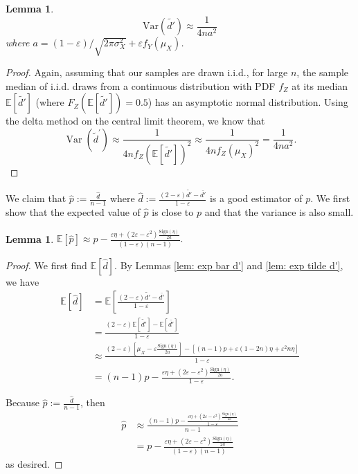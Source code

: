 \documentclass[10pt,onecolumn,letterpaper]{article}
\newtheorem{lem}[thm]{Lemma}
\newcommand{\ee}{\mathbb{E}}
\newcommand{\Var}{\mathrm{Var}}
\newcommand{\eps}{\varepsilon}
\begin{document}
\begin{lem} \label{lem: var tilde d'}
$$\Var(\tilde{d'}) \approx \frac{1}{4na^2}$$ where $a = (1-\eps)/\sqrt{2\pi\sigma_X^2} + \eps f_Y(\mu_X)$.
\end{lem}
\begin{proof}
Again, assuming that our samples are drawn i.i.d., for large $n$, the sample median of i.i.d. draws from a continuous distribution with PDF $f_Z$ at its median $\ee[\tilde{d'}]$ (where $F_Z(\ee[\tilde{d'}])=0.5$) has an asymptotic normal distribution. Using the delta method on the central limit theorem, we know that $$\operatorname{Var}\left(\tilde{d}^{\prime}\right) \approx \frac{1}{4 n f_Z(\ee[\tilde{d'}])^2} \approx \frac{1}{4 n f_Z(\mu_X)^2} = \frac{1}{4na^2}.$$
\end{proof}

We claim that $\hat p := \frac{\hat d}{n-1}$ where $\hat d := \frac{(2-\eps)\tilde{d'} - \bar{d'}}{1-\eps}$ is a good estimator of $p$. We first show that the expected value of $\hat p$ is close to $p$ and that the variance is also small.

\begin{lem}\label{lem: exp p_hat}
$\ee[\hat p] \approx p - \frac{\eps\eta + (2\eps-\eps^2)\frac{\mathrm{Sign}(\eta)}{2a}}{(1-\eps)(n-1)}.$
\end{lem}
\begin{proof}
We first find $\ee[\hat d]$. By Lemmas \ref{lem: exp bar d'} and \ref{lem: exp tilde d'}, we have \begin{align*}
    \ee[\hat d] &= \ee\left[\frac{(2-\eps)\tilde{d'} - \bar{d'}}{1-\eps}\right]\\
    &= \frac{(2-\eps)\ee[\tilde{d'}] - \ee[\bar{d'}]}{1-\eps}\\
    &\approx \frac{(2-\eps)\left[\mu_X - \eps\frac{\mathrm{Sign}(\eta)}{2a}\right] - [(n-1)p + \eps(1-2n)\eta + \eps^2n\eta]}{1-\eps}\\
    &= (n-1)p - \frac{\eps\eta + (2\eps-\eps^2)\frac{\mathrm{Sign}(\eta)}{2a}}{1-\eps}.
\end{align*}

Because $\hat p :=\frac{\hat d}{n-1}$, then \begin{align*}
    \hat p &\approx \frac{(n-1)p - \frac{\eps\eta + (2\eps-\eps^2)\frac{\mathrm{Sign}(\eta)}{2a}}{1-\eps}}{n-1}\\
    &= p - \frac{\eps\eta + (2\eps-\eps^2)\frac{\mathrm{Sign}(\eta)}{2a}}{(1-\eps)(n-1)}
\end{align*} as desired.
\end{proof}
\end{document}

